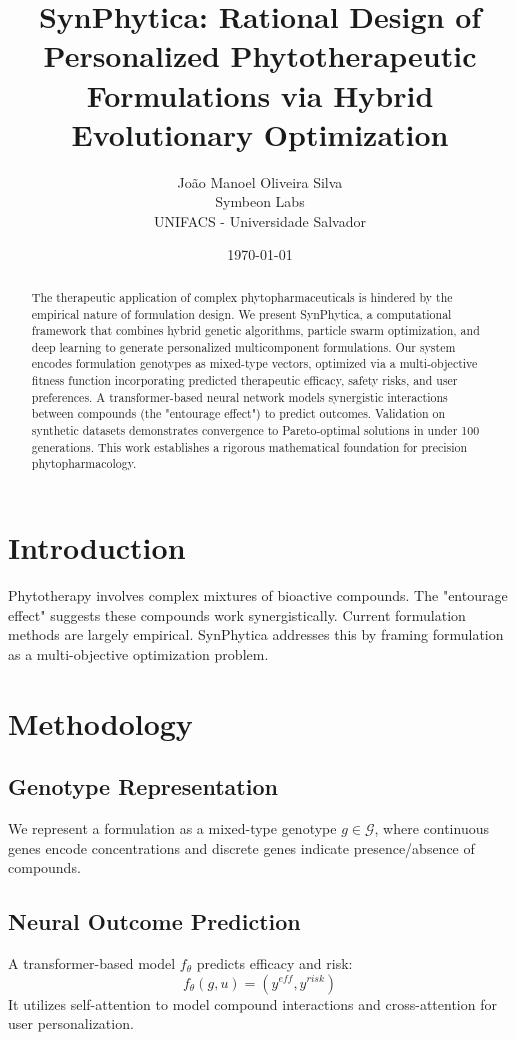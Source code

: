 \documentclass{article}
\title{SynPhytica: Rational Design of Personalized Phytotherapeutic Formulations via Hybrid Evolutionary Optimization}
\author{Jo\~ao Manoel Oliveira Silva \\ Symbeon Labs \\ UNIFACS - Universidade Salvador}
\date{\today}
\begin{document}
\maketitle

\begin{abstract}
The therapeutic application of complex phytopharmaceuticals is hindered by the empirical nature of formulation design. We present SynPhytica, a computational framework that combines hybrid genetic algorithms, particle swarm optimization, and deep learning to generate personalized multicomponent formulations. Our system encodes formulation genotypes as mixed-type vectors, optimized via a multi-objective fitness function incorporating predicted therapeutic efficacy, safety risks, and user preferences. A transformer-based neural network models synergistic interactions between compounds (the "entourage effect") to predict outcomes. Validation on synthetic datasets demonstrates convergence to Pareto-optimal solutions in under 100 generations. This work establishes a rigorous mathematical foundation for precision phytopharmacology.
\end{abstract}

\section{Introduction}
Phytotherapy involves complex mixtures of bioactive compounds. The "entourage effect" suggests these compounds work synergistically. Current formulation methods are largely empirical. SynPhytica addresses this by framing formulation as a multi-objective optimization problem.

\section{Methodology}
\subsection{Genotype Representation}
We represent a formulation as a mixed-type genotype $g \in \mathcal{G}$, where continuous genes encode concentrations and discrete genes indicate presence/absence of compounds.

\subsection{Neural Outcome Prediction}
A transformer-based model $f_\theta$ predicts efficacy and risk:
$$ f_\theta(g, u) = (y^{eff}, y^{risk}) $$
It utilizes self-attention to model compound interactions and cross-attention for user personalization.
\end{document}
